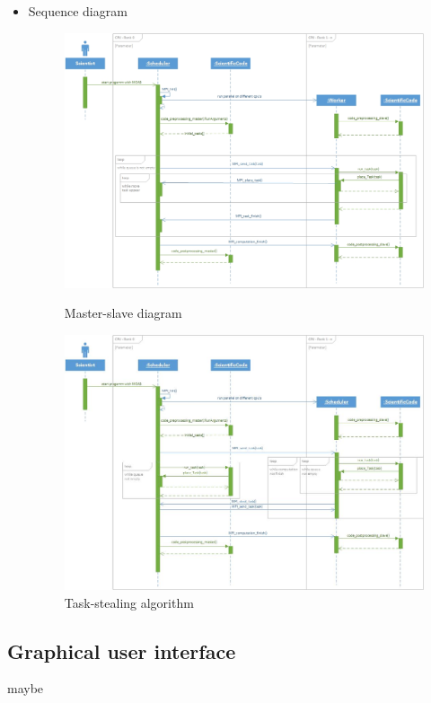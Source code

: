 \begin{itemize}
\item Sequence diagram \newline
	\begin{figure}
	\includegraphics[width=15cm]{images/Master-slave.jpg}
	\caption{Master-slave diagram} 
	\includegraphics[width=15cm]{images/Task-stealing.jpg}
	\caption{Task-stealing algorithm}
	\end{figure}
\end{itemize}
\subsection{Graphical user interface}
			maybe